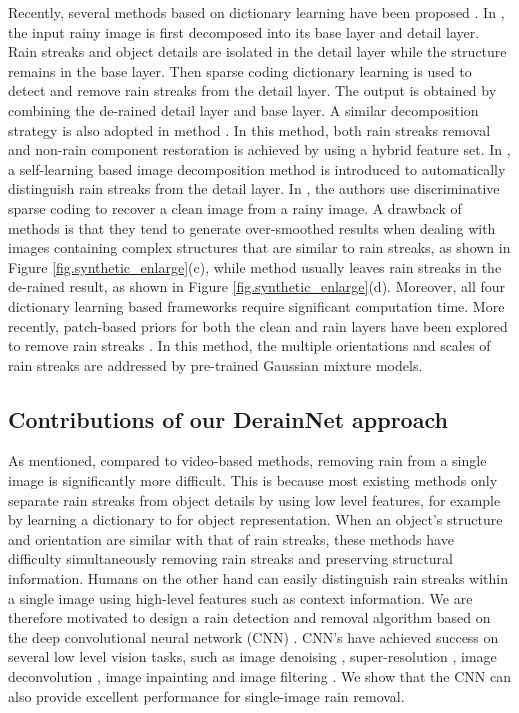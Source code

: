 \documentclass[journal]{IEEEtran}
\begin{document}
Recently, several methods based on dictionary learning have been proposed  \cite{Huang2012ICME,12,13,16,37}. In \cite{12}, the input rainy image is first decomposed into its base layer and detail layer. Rain streaks and object details are isolated in the detail layer while the structure remains in the base layer. Then sparse coding dictionary learning is used to detect and remove rain streaks from the detail layer. The output is obtained by combining the de-rained detail layer and base layer. A similar decomposition strategy is also adopted in method \cite{37}. In this method, both rain streaks removal and non-rain component restoration is achieved by using a hybrid feature set. In  \cite{13}, a self-learning based image decomposition method is introduced to automatically distinguish rain streaks from the detail layer. In  \cite{16}, the authors use discriminative sparse coding to recover a clean image from a rainy image. A drawback of methods \cite{12,13} is that they tend to generate over-smoothed 
results when dealing with images containing complex structures that are similar to rain streaks, as shown in Figure \ref{fig.synthetic_enlarge}(c), while method \cite{16} usually leaves rain streaks in the de-rained result, as shown in Figure \ref{fig.synthetic_enlarge}(d). Moreover, all four dictionary learning based frameworks \cite{12,13,16,37} require significant computation time. More recently, patch-based priors for both the clean and rain layers have been explored to remove rain streaks \cite{34}. In this method, the multiple orientations and scales of rain streaks are addressed by pre-trained Gaussian mixture models.


\subsection{Contributions of our DerainNet approach}
As mentioned, compared to video-based methods, removing rain from a single image is significantly more difficult. This is because most existing methods \cite{12,13,16,34} only separate rain streaks from object details by using low level features, for example by learning a dictionary to for object representation. When an object's structure and orientation are similar with that of rain streaks, these methods have difficulty simultaneously removing rain streaks and preserving structural information. Humans on the other hand can easily distinguish rain streaks within a single image using high-level features such as context information. We are therefore motivated to design a rain detection and removal algorithm based on the deep convolutional neural network (CNN) \cite{17,lecun1998gradient}. CNN's have achieved success on several low level vision tasks, such as image denoising \cite{18}, super-resolution \cite{19,35}, image deconvolution \cite{20}, image inpainting \cite{22} 
and image filtering \cite{21}. We show that the CNN can also provide excellent performance for single-image rain removal.
\end{document}

